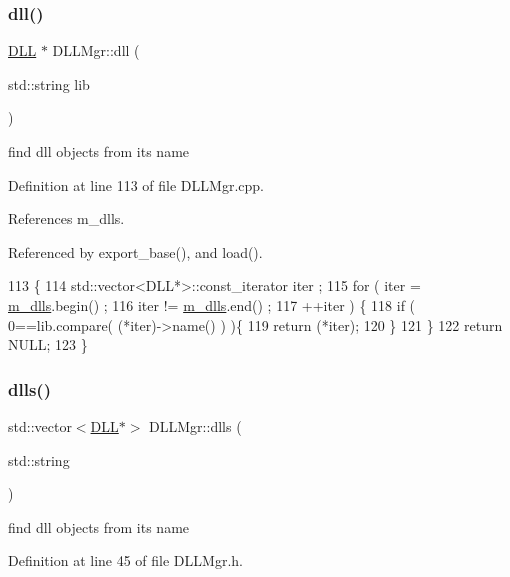 \subsubsection{\texorpdfstring{dll()}{dll()}}
{\footnotesize\ttfamily \hyperlink{classDLL}{D\+LL} $\ast$ D\+L\+L\+Mgr\+::dll (\begin{DoxyParamCaption}\item[{std\+::string}]{lib }\end{DoxyParamCaption})}

find dll objects from its name 

Definition at line 113 of file D\+L\+L\+Mgr.\+cpp.



References m\+\_\+dlls.



Referenced by export\+\_\+base(), and load().


\begin{DoxyCode}
113                                  \{
114   std::vector<DLL*>::const\_iterator iter ;
115   \textcolor{keywordflow}{for} ( iter = \hyperlink{classDLLMgr_a5bd713edea21d64f32aa71162bca581a}{m\_dlls}.begin() ; 
116         iter != \hyperlink{classDLLMgr_a5bd713edea21d64f32aa71162bca581a}{m\_dlls}.end()  ; 
117         ++iter ) \{
118     \textcolor{keywordflow}{if} ( 0==lib.compare( (*iter)->name() ) )\{
119       \textcolor{keywordflow}{return} (*iter);
120     \}
121   \}
122   \textcolor{keywordflow}{return} NULL;
123 \}
\end{DoxyCode}
\mbox{\label{classDLLMgr_a40a2b326bd4f01e58b4afa78a3773898}} 
\subsubsection{\texorpdfstring{dlls()}{dlls()}}
{\footnotesize\ttfamily std\+::vector$<$\hyperlink{classDLL}{D\+LL}$\ast$$>$ D\+L\+L\+Mgr\+::dlls (\begin{DoxyParamCaption}\item[{std\+::string}]{ }\end{DoxyParamCaption})\hspace{0.3cm}{\ttfamily [inline]}}

find dll objects from its name 

Definition at line 45 of file D\+L\+L\+Mgr.\+h.



